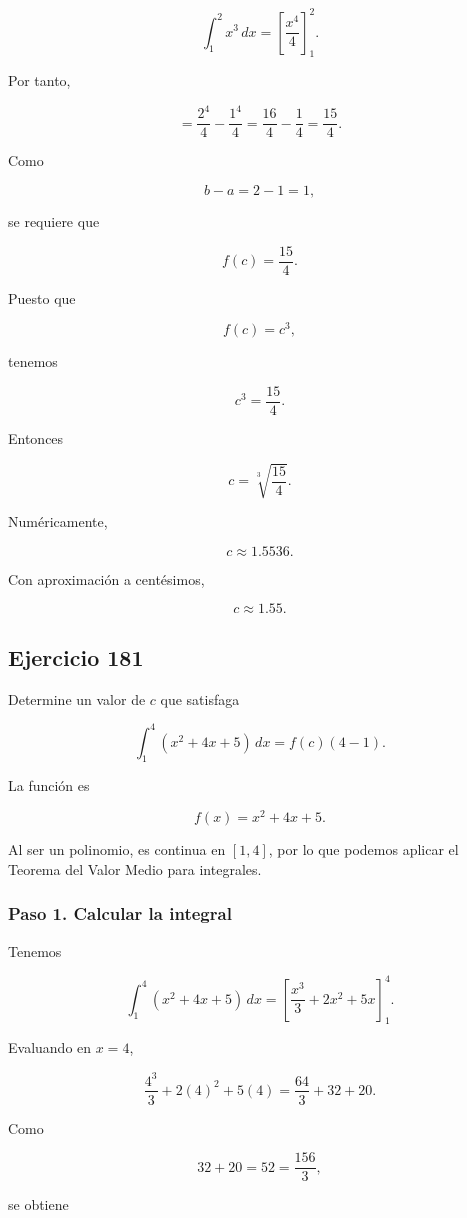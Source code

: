 \documentclass[12pt]{article}
\begin{document}
\[
\int_1^2x^3\,dx
=
\left[\frac{x^4}{4}\right]_1^2.
\]

Por tanto,

\[
=
\frac{2^4}{4}-\frac{1^4}{4}
=
\frac{16}{4}-\frac14
=
\frac{15}{4}.
\]

Como

\[
b-a=2-1=1,
\]

se requiere que

\[
f(c)=\frac{15}{4}.
\]

Puesto que

\[
f(c)=c^3,
\]

tenemos

\[
c^3=\frac{15}{4}.
\]

Entonces

\[
c=\sqrt[3]{\frac{15}{4}}.
\]

Numéricamente,

\[
c\approx1.5536.
\]

Con aproximación a centésimos,

\[
\boxed{c\approx1.55}.
\]

\subsection*{Ejercicio 181}

Determine un valor de \(c\) que satisfaga

\[
\int_1^4(x^2+4x+5)\,dx
=
f(c)(4-1).
\]

La función es

\[
f(x)=x^2+4x+5.
\]

Al ser un polinomio, es continua en \([1,4]\), por lo que podemos
aplicar el Teorema del Valor Medio para integrales.

\subsubsection*{Paso 1. Calcular la integral}

Tenemos

\[
\int_1^4(x^2+4x+5)\,dx
=
\left[
\frac{x^3}{3}+2x^2+5x
\right]_1^4.
\]

Evaluando en \(x=4\),

\[
\frac{4^3}{3}+2(4)^2+5(4)
=
\frac{64}{3}+32+20.
\]

Como

\[
32+20=52=\frac{156}{3},
\]

se obtiene
\end{document}
